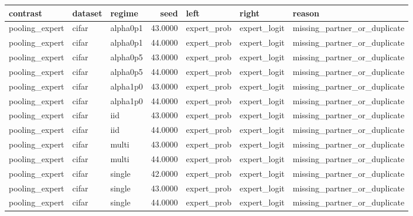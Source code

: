 \begin{tabular}{lllrlll}
\toprule
contrast & dataset & regime & seed & left & right & reason \\
\midrule
pooling\_expert & cifar & alpha0p1 & 43.0000 & expert\_prob & expert\_logit & missing\_partner\_or\_duplicate \\
pooling\_expert & cifar & alpha0p1 & 44.0000 & expert\_prob & expert\_logit & missing\_partner\_or\_duplicate \\
pooling\_expert & cifar & alpha0p5 & 43.0000 & expert\_prob & expert\_logit & missing\_partner\_or\_duplicate \\
pooling\_expert & cifar & alpha0p5 & 44.0000 & expert\_prob & expert\_logit & missing\_partner\_or\_duplicate \\
pooling\_expert & cifar & alpha1p0 & 43.0000 & expert\_prob & expert\_logit & missing\_partner\_or\_duplicate \\
pooling\_expert & cifar & alpha1p0 & 44.0000 & expert\_prob & expert\_logit & missing\_partner\_or\_duplicate \\
pooling\_expert & cifar & iid & 43.0000 & expert\_prob & expert\_logit & missing\_partner\_or\_duplicate \\
pooling\_expert & cifar & iid & 44.0000 & expert\_prob & expert\_logit & missing\_partner\_or\_duplicate \\
pooling\_expert & cifar & multi & 43.0000 & expert\_prob & expert\_logit & missing\_partner\_or\_duplicate \\
pooling\_expert & cifar & multi & 44.0000 & expert\_prob & expert\_logit & missing\_partner\_or\_duplicate \\
pooling\_expert & cifar & single & 42.0000 & expert\_prob & expert\_logit & missing\_partner\_or\_duplicate \\
pooling\_expert & cifar & single & 43.0000 & expert\_prob & expert\_logit & missing\_partner\_or\_duplicate \\
pooling\_expert & cifar & single & 44.0000 & expert\_prob & expert\_logit & missing\_partner\_or\_duplicate \\
\bottomrule
\end{tabular}
